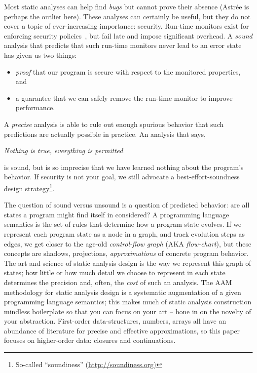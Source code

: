 Most static analyses can help find \emph{bugs} but cannot prove their absence (Astr\'ee is perhaps the outlier here).
%
These analyses can certainly be useful, but they do not cover a topic of ever-increasing importance: security.
%
Run-time monitors exist for enforcing security policies~\citep{?}, but fail late and impose significant overhead.
%
A \emph{sound} analysis that predicts that such run-time monitors never lead to an error state has given us two things:
\begin{itemize}
\item{\emph{proof} that our program is secure with respect to the monitored properties, and}
\item{a guarantee that we can safely remove the run-time monitor to improve performance.}
\end{itemize}
A \emph{precise} analysis is able to rule out enough spurious behavior that such predictions are actually possible in practice.
%
An analysis that says,
\begin{center}
  \textit{Nothing is true, everything is permitted}
\end{center}
is sound, but is so imprecise that we have learned nothing about the program's behavior. 
%
If security is not your goal, we still advocate a best-effort-soundness design strategy\footnote{So-called ``soundiness'' (\url{http://soundiness.org})}.

The question of sound versus unsound is a question of predicted behavior: are all states a program might find itself in considered?
%
A programming language semantics is the set of rules that determine how a program state evolves.
%
If we represent each program state as a node in a graph, and track evolution steps as edges, we get closer to the age-old \emph{control-flow graph} (AKA \emph{flow-chart}), but these concepts are shadows, projections, \emph{approximations} of concrete program behavior.
%
The art and science of static analysis design is the way we represent this graph of states; how little or how much detail we choose to represent in each state determines the precision and, often, the \emph{cost} of such an analysis.
%
The AAM methodology for static analysis design is a systematic augmentation of a given programming language semantics; this makes much of static analysis construction mindless boilerplate so that you can focus on your art -- hone in on the novelty of your abstraction.
%
First-order data-structures, numbers, arrays all have an abundance of literature for precise and effective approximations, so this paper focuses on higher-order data: closures and continuations.
%

